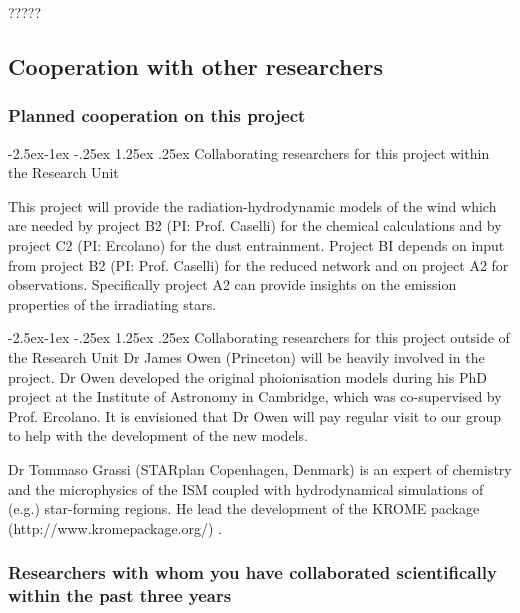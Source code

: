 \documentclass[10pt,fleqn,twoside]{article}
\makeatletter
\newcommand{\Tcol}{\color{blue}}
\renewcommand\paragraph{\@startsection{paragraph}{4}{\z@}%
            {-2.5ex\@plus -1ex \@minus -.25ex}%
            {1.25ex \@plus .25ex}%
            {\normalfont\normalsize\bfseries}}
\makeatother
\begin{document}
?????


\subsection{\Tcol Cooperation with other researchers}

\subsubsection{\Tcol Planned cooperation on this project}

\paragraph{\Tcol Collaborating researchers for this project within the
  Research Unit}


This project will provide the radiation-hydrodynamic models of the
wind which are needed by project B2 (PI: Prof. Caselli) for the
chemical calculations and by project C2 (PI: Ercolano) for the dust
entrainment. Project BI depends on input from project B2 (PI:
Prof. Caselli)  for the reduced network and on
project A2 for observations. Specifically project A2 can
provide insights on the emission properties of the irradiating stars.

\paragraph{\Tcol Collaborating researchers for this project outside of
  the Research Unit}
Dr James Owen (Princeton) will be heavily involved in the
project. Dr Owen developed the original
phoionisation models during his PhD project at the Institute of
Astronomy in Cambridge, which was co-supervised by
Prof. Ercolano. It is envisioned that Dr Owen will pay regular visit
to our group to help with the development of the new models. 

Dr Tommaso Grassi (STARplan Copenhagen, Denmark) is an expert of
chemistry and the microphysics of the ISM coupled with hydrodynamical
simulations of (e.g.) star-forming regions. He lead the development of the
KROME package (http://www.kromepackage.org/) . 

\subsubsection{\Tcol Researchers with whom you have collaborated scientifically within the past three years}
\end{document}
